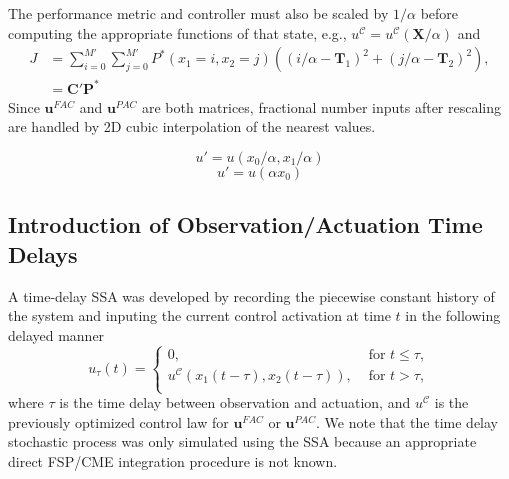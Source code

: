 \documentclass[12pt]{article}
\begin{document}
The performance metric and controller must also be scaled by $1/\alpha$ before computing the appropriate functions of that state, e.g., ${u}^{\mathcal{C}} = {u}^{\mathcal{C}}(\mathbf{X}/\alpha)$ and 
{\small \begin{align}
J &= \sum_{i=0}^{M'}  \sum_{j=0}^{M'}P^*(x_1=i,x_2=j) ((i/\alpha - \mathbf T_1)^2 + (j/\alpha -\mathbf T_2)^2),\nonumber \\
& =\mathbf{C}'\mathbf{P}^*
\label{EuclidV}
\end{align}}
Since $\mathbf{u}^{FAC}$ and $\mathbf{u}^{PAC}$ are both matrices, fractional number inputs after rescaling are handled by 2D cubic interpolation of the nearest values.

\begin{equation}
u'=u(x_0 / \alpha, x_1 / \alpha) 
\end{equation}
\begin{equation}
u'=u(\alpha x_0)
\end{equation}

\subsection{Introduction of Observation/Actuation Time Delays}
A time-delay SSA was developed by recording the piecewise constant history of the system and inputing the current control activation at time $t$ in the following delayed manner
\begin{equation}
u_{\tau}(t)=\left\{
\begin{array}{rl}
      0 ,&\text{ for }  t \leq \tau, \\
      {u}^{\mathcal{C}}(x_1(t-\tau), x_2(t-\tau)) , &\text{ for }   t > \tau,\\
\end{array}\right. 
\label{scoreeq}
\end{equation}
where $\tau$ is the time delay between observation and actuation, and ${u}^{\mathcal{C}}$ is the previously optimized control law for $\mathbf{u}^{FAC}$ or $\mathbf{u}^{PAC}$. We note that the time delay stochastic process was only simulated using the SSA because an appropriate direct FSP/CME integration procedure is not known.
\end{document}
